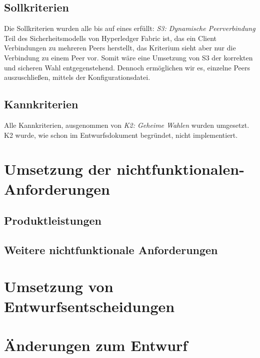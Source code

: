 \documentclass[parskip=full]{scrartcl}
\begin{document}
\subsection{Sollkriterien}
Die Sollkriterien wurden alle bis auf eines erfüllt:
\textit{S3: Dynamische Peerverbindung}\\
Teil des Sicherheitsmodells von Hyperledger Fabric ist, das ein Client Verbindungen zu mehreren Peers herstellt, das Kriterium sieht aber nur die Verbindung zu einem Peer vor.
Somit wäre eine Umsetzung von S3 der korrekten und sicheren Wahl entgegenstehend. Dennoch ermöglichen wir es, einzelne Peers auszuschließen, mittels der Konfigurationsdatei. 

\subsection{Kannkriterien}
Alle Kannkriterien, ausgenommen von \textit{K2: Geheime Wahlen} wurden umgesetzt. K2 wurde, wie schon im Entwurfsdokument begründet, nicht implementiert.

\section{Umsetzung der nichtfunktionalen-Anforderungen}

\subsection{Produktleistungen}
	
\subsection{Weitere nichtfunktionale Anforderungen}

		
\section{Umsetzung von Entwurfsentscheidungen}


\section{Änderungen zum Entwurf}
\end{document}

